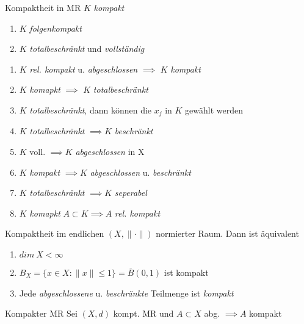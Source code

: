 \begin{satz}{Kompaktheit in MR}
  $K$ \textit{kompakt}
  \begin{enumerate}[label = $\Leftrightarrow$]
    \item $K$ \textit{folgenkompakt}
    \item $K$ \textit{totalbeschränkt} und \textit{vollständig}
  \end{enumerate}
\end{satz}

\begin{bemerkung}
  \begin{enumerate}[label=(\roman*)]
    \item $K$ \textit{rel. kompakt} u. \textit{abgeschlossen}
      $\implies$ $K$ \textit{kompakt}
    \item $K$ \textit{komapkt} $\implies$ $K$ \textit{totalbeschränkt}
    \item $K$ \textit{totalbeschränkt}, dann können die $x_j$ in $K$
      gewählt werden
    \item $K$ \textit{totalbeschränkt} $\implies K$ \textit{beschränkt}
    \item $K$ voll. $\implies K$ \textit{abgeschlossen} in X
    \item $K$ \textit{kompakt} $\implies K$ \textit{abgeschlossen} u.
      \textit{beschränkt}
    \item $K$ \textit{totalbeschränkt} $\implies K$
      \textit{seperabel}
    \item $K$ \textit{komapkt} $A \subset K \implies A$ \textit{rel. kompakt}
  \end{enumerate}
\end{bemerkung}

\begin{satz}{Kompaktheit im endlichen}
  $(X, \|\cdot\|)$ normierter Raum. Dann ist äquivalent
  \begin{enumerate}[label = (\roman*)]
    \item $dim\ X < \infty$
    \item $B_X = \{x\in X: \|x\| \leq 1\} = \overline{B}(0,1)$ ist kompakt
    \item Jede \textit{abgeschlossene} u. \textit{beschränkte} Teilmenge ist
      \textit{kompakt}
  \end{enumerate}
\end{satz}

\begin{satz}{Kompakter MR}
  Sei \((X,d)\) kompt. MR und \(A\subset X\) abg. \(\implies A\) kompakt
\end{satz}

